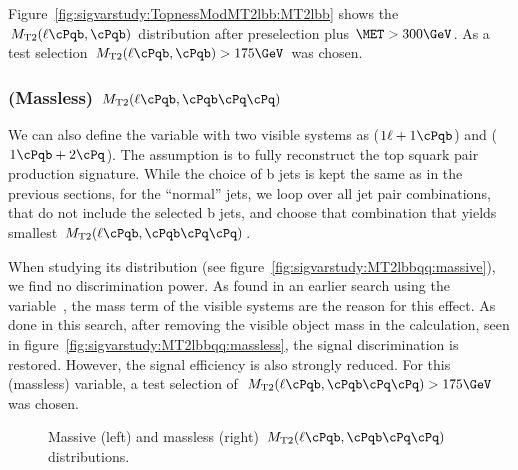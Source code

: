 Figure~\ref{fig:sigvarstudy:TopnessModMT2lbb:MT2lbb} shows the $\MTt(\ell\cPqb,\cPqb)$ distribution after preselection plus $\MET>300\GeV$. As a test selection $\MTt(\ell\cPqb,\cPqb)>175\GeV$ was chosen.

\subsubsection{(Massless) $\MTt(\ell\cPqb,\cPqb\cPq\cPq)$}

We can also define the \MTt variable with two visible systems as ($1\ell + 1\cPqb$) and ($1\cPqb+2\cPq$). The assumption is to fully reconstruct the top squark pair production signature. While the choice of b jets is kept the same as in the previous sections, for the ``normal'' jets, we loop over all jet pair combinations, that do not include the selected b jets, and choose that combination that yields smallest $\MTt(\ell\cPqb,\cPqb\cPq\cPq)$.

When studying its distribution (see figure~\ref{fig:sigvarstudy:MT2lbbqq:massive}), we find no discrimination power. As found in an earlier search using the \MTt variable~\cite{Khachatryan:2015vra}, the mass term of the visible systems are the reason for this effect. As done in this search, after removing the visible object mass in the \MTt calculation, seen in figure~\ref{fig:sigvarstudy:MT2lbbqq:massless}, the signal discrimination is restored. However, the signal efficiency is also strongly reduced. For this (massless) variable, a test selection of $\MTt(\ell\cPqb,\cPqb\cPq\cPq)>175\GeV$ was chosen.


\begin{figure}
\caption{\label{fig:sigvarstudy:MT2lbbqq} Massive (left) and massless (right) $\MTt(\ell\cPqb,\cPqb\cPq\cPq)$ distributions.}
\end{figure}

